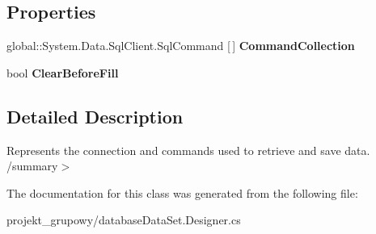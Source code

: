 \subsection*{Properties}
\begin{DoxyCompactItemize}
\item 
\mbox{\label{classprojekt__grupowy_1_1database_data_set_table_adapters_1_1_table_table_adapter_ad53e7649f9f3abef0b023deb1a49e262}} 
global\+::\+System.\+Data.\+Sql\+Client.\+Sql\+Command \mbox{[}$\,$\mbox{]} {\bfseries Command\+Collection}
\item 
\mbox{\label{classprojekt__grupowy_1_1database_data_set_table_adapters_1_1_table_table_adapter_a5b6398a078e60df017cb3a44f60dfdb9}} 
bool {\bfseries Clear\+Before\+Fill}
\end{DoxyCompactItemize}


\subsection{Detailed Description}
Represents the connection and commands used to retrieve and save data. /summary$>$ 

The documentation for this class was generated from the following file\+:\begin{DoxyCompactItemize}
\item 
projekt\+\_\+grupowy/database\+Data\+Set.\+Designer.\+cs\end{DoxyCompactItemize}

